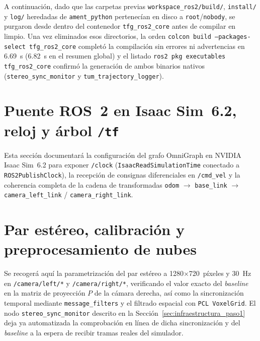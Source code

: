 A continuación, dado que las carpetas previas \texttt{workspace\_ros2/build/}, \texttt{install/} y \texttt{log/} heredadas de \texttt{ament\_python} pertenecían en disco a \texttt{root}/\texttt{nobody}, se purgaron desde dentro del contenedor \texttt{tfg\_ros2\_core} antes de compilar en limpio. Una vez eliminados esos directorios, la orden \texttt{colcon build --packages-select tfg\_ros2\_core} completó la compilación sin errores ni advertencias en \qty{6.69}{\second} (\qty{6.82}{\second} en el resumen global) y el listado \texttt{ros2 pkg executables tfg\_ros2\_core} confirmó la generación de ambos binarios nativos (\texttt{stereo\_sync\_monitor} y \texttt{tum\_trajectory\_logger}).


\section{Puente ROS~2 en Isaac Sim~6.2, reloj y árbol \texttt{/tf}}
\label{sec:puente_isaac_tf}

Esta sección documentará la configuración del grafo OmniGraph en NVIDIA Isaac Sim~6.2 para exponer \texttt{/clock} (\texttt{IsaacReadSimulationTime} conectado a \texttt{ROS2PublishClock}), la recepción de consignas diferenciales en \texttt{/cmd\_vel} y la coherencia completa de la cadena de transformadas \texttt{odom} $\rightarrow$ \texttt{base\_link} $\rightarrow$ \texttt{camera\_left\_link} / \texttt{camera\_right\_link}.


\section{Par estéreo, calibración y preprocesamiento de nubes}
\label{sec:par_estereo}

Se recogerá aquí la parametrización del par estéreo a \num{1280}\(\times\)\num{720}~píxeles y \qty{30}{\hertz} en \texttt{/camera/left/*} y \texttt{/camera/right/*}, verificando el valor exacto del \textit{baseline} en la matriz de proyección $P$ de la cámara derecha, así como la sincronización temporal mediante \texttt{message\_filters} y el filtrado espacial con \texttt{PCL VoxelGrid}. El nodo \texttt{stereo\_sync\_monitor} descrito en la Sección~\ref{sec:infraestructura_paso1} deja ya automatizada la comprobación en línea de dicha sincronización y del \textit{baseline} a la espera de recibir tramas reales del simulador.

